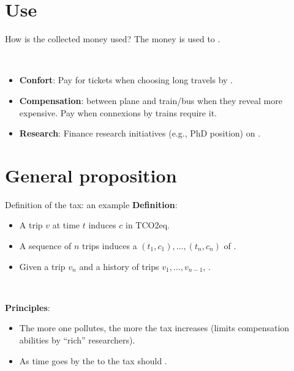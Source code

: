 \documentclass[french, english]{beamer}
\begin{document}
\section{Use}
\begin{frame}{How is the collected money used?}
The money is used to .

\

\begin{itemize} 
    \item \textbf{Confort}: Pay for  tickets when choosing long travels by . 
    \item \textbf{Compensation}:  between plane and train/bus when they reveal more expensive.  Pay  when connexions by trains require it.
    \item \textbf{Research}: Finance research initiatives (e.g., PhD position) on .
\end{itemize}	
\end{frame}

\section{General proposition}
\begin{frame}{Definition of the tax: an example}
\textbf{Definition}:
\begin{itemize}
\item A trip $v$ at time $t$ induces  $c$ in TCO2eq.
\item A sequence of $n$ trips induces a  $(t_1, c_1),\ldots,(t_n,c_n)$ of .
\item Given a trip $v_n$ and a history of trips $v_1,\ldots, v_{n-1}$, .  
\end{itemize}

\

\textbf{Principles}:
\begin{itemize}
\item The more one pollutes, the more the tax increases (limits compensation abilities by “rich” researchers). 
\item As time goes by the  to the tax should .
\end{itemize}
\end{frame}
\end{document}
